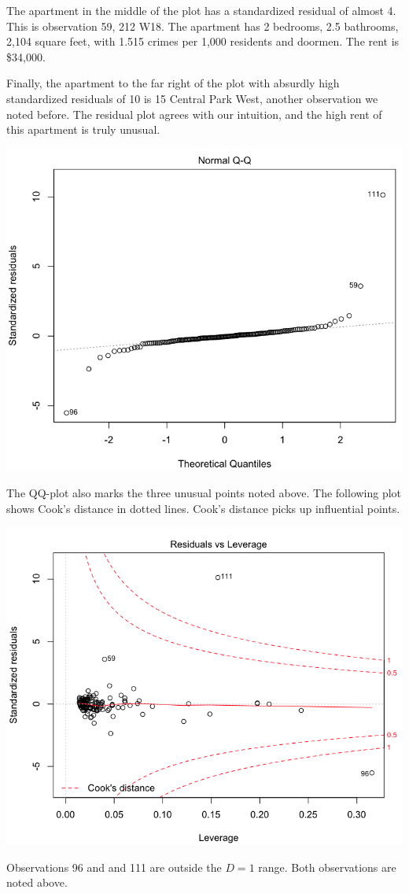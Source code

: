 \documentclass[a4 paper, 11 pt, twocolumn]{article}
\begin{document}
The apartment in the middle of the plot has a standardized residual of almost 4. This is observation 59, 212 W18. The apartment has 2 bedrooms, 2.5 bathrooms, 2,104 square feet, with 1.515 crimes per 1,000 residents and doormen. The rent is \$34,000.

Finally, the apartment to the far right of the plot with absurdly high standardized residuals of 10 is 15 Central Park West, another observation we noted before. The residual plot agrees with our intuition, and the high rent of this apartment is truly unusual.

\begin{center}
\includegraphics[scale=0.3]{QQ}
\end{center}
The QQ-plot also marks the three unusual points noted above. The following plot shows Cook's distance in dotted lines. Cook's distance picks up influential points.
\begin{center}
\includegraphics[scale=0.3]{CooksD}
\end{center}
Observations 96 and and 111 are outside the $D=1$ range. Both observations are noted above.
\end{document}
